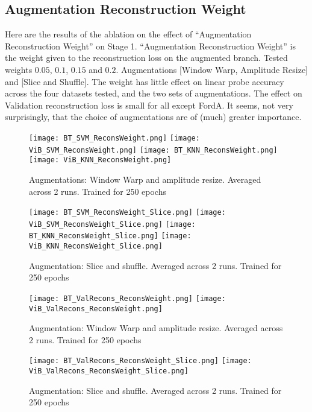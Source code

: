 \documentclass[../../thesis.tex]{subfiles}
\begin{document}
\subsection{Augmentation Reconstruction Weight}
Here are the results of the ablation on the effect of “Augmentation Reconstruction Weight” on Stage 1.
“Augmentation Reconstruction Weight” is the weight given to the reconstruction loss on the augmented branch.
Tested weights $0.05$, $0.1$, $0.15$ and $0.2$.
Augmentations [Window Warp, Amplitude Resize] and [Slice and Shuffle].
The weight has little effect on linear probe accuracy across the four datasets tested, and the two sets of augmentations.
The effect on Validation reconstruction loss is small for all except FordA.
It seems, not very surprisingly, that the choice of augmentations are of (much) greater importance.
\begin{figure}[h]
    \texttt{[image: BT\_SVM\_ReconsWeight.png]}
    \texttt{[image: ViB\_SVM\_ReconsWeight.png]}
    \texttt{[image: BT\_KNN\_ReconsWeight.png]}
    \texttt{[image: ViB\_KNN\_ReconsWeight.png]}
    \centering  
    \caption{Augmentations: Window Warp and amplitude resize. Averaged across 2 runs. Trained for 250 epochs}  
\end{figure}

\begin{figure}[h]
    \texttt{[image: BT\_SVM\_ReconsWeight\_Slice.png]}
    \texttt{[image: ViB\_SVM\_ReconsWeight\_Slice.png]}
    \texttt{[image: BT\_KNN\_ReconsWeight\_Slice.png]}
    \texttt{[image: ViB\_KNN\_ReconsWeight\_Slice.png]}

    \caption{Augmentation: Slice and shuffle. Averaged across 2 runs. Trained for 250 epochs}  
\end{figure}

\begin{figure}[h]
    \texttt{[image: BT\_ValRecons\_ReconsWeight.png]}
    \texttt{[image: ViB\_ValRecons\_ReconsWeight.png]}
    \caption{Augmentation: Window Warp and amplitude resize. Averaged across 2 runs. Trained for 250 epochs}  
\end{figure}
\begin{figure}[h]
    \texttt{[image: BT\_ValRecons\_ReconsWeight\_Slice.png]}
    \texttt{[image: ViB\_ValRecons\_ReconsWeight\_Slice.png]}
    \caption{Augmentation: Slice and shuffle. Averaged across 2 runs. Trained for 250 epochs}  
\end{figure}
\end{document}
